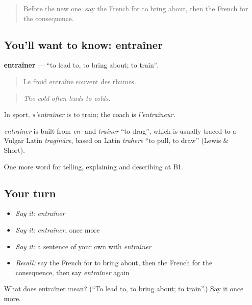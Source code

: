 \begin{quote}
Before the new one: say the French for to bring about, then the French for the consequence.
\end{quote}

\subsection*{You'll want to know: entraîner}
\textbf{entraîner} — \textquotedblleft{}to lead to, to bring about; to train\textquotedblright{}.

\begin{quote}
Le froid entraîne souvent des rhumes.
\end{quote}

\begin{quote}
\emph{The cold often leads to colds.}
\end{quote}

In sport, \emph{s'entraîner} is to train; the coach is \emph{l'entraîneur}.

\begin{cousinweb}
\emph{entraîner} is built from \emph{en-} and \emph{traîner} \textquotedblleft{}to drag\textquotedblright{}, which is usually traced to a Vulgar Latin \emph{tragīnāre}, based on Latin \emph{trahere} \textquotedblleft{}to pull, to draw\textquotedblright{} (Lewis \& Short).
\end{cousinweb}

\begin{grammarlens}[title={What you've built}]
One more word for telling, explaining and describing at B1.
\end{grammarlens}

\subsection*{Your turn}
\begin{itemize}
\raggedright
  \item \emph{Say it:} \emph{entraîner}
  \item \emph{Say it:} \emph{entraîner}, once more
  \item \emph{Say it:} a sentence of your own with \emph{entraîner}
  \item \emph{Recall:} say the French for to bring about, then the French for the consequence, then say \emph{entraîner} again
\end{itemize}

\begin{tcolorbox}[breakable,colback=teal!4,colframe=teal!35!black,title={Before you move on}]
What does entraîner mean? (\textquotedblleft{}To lead to, to bring about; to train\textquotedblright{}.) Say it once more.
\end{tcolorbox}
